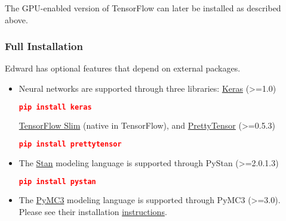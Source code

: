 The GPU-enabled version of TensorFlow can later be installed as
described above.

\subsubsection{Full Installation}

Edward has optional features that depend on external packages.

\begin{itemize}
  \item Neural networks are supported through three
  libraries:
  \href{http://keras.io}{Keras} (>=1.0)
\begin{lstlisting}[language=JSON]
pip install keras
\end{lstlisting}
\href{https://github.com/tensorflow/tensorflow/tree/master/tensorflow/contrib/slim}{TensorFlow
Slim} (native in TensorFlow), and
\href{https://github.com/google/prettytensor}{PrettyTensor} (>=0.5.3)
\begin{lstlisting}[language=JSON]
pip install prettytensor
\end{lstlisting}
  \item The \href{http://mc-stan.org}{Stan} modeling language is supported
  through PyStan (>=2.0.1.3)
\begin{lstlisting}[language=JSON]
pip install pystan
\end{lstlisting}
  \item The \href{http://pymc-devs.github.io/pymc3/}{PyMC3} modeling language is supported
  through PyMC3 (>=3.0). Please see their installation
  \href{http://pymc-devs.github.io/pymc3/notebooks/getting_started.html}
  {instructions}.
\end{itemize}
